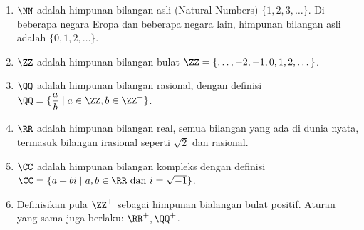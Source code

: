 	\begin{enumerate}
	\item $\NN$ adalah himpunan bilangan asli (Natural Numbers) $\{1,2,3,\dots\}$. Di beberapa negara Eropa dan beberapa negara lain, himpunan bilangan asli adalah $\{0,1,2,\dots\}$.
	\item $\ZZ$ adalah himpunan bilangan bulat $\ZZ=\{\dots,-2,-1,0,1,2,\dots\}$.
	\item $\QQ$ adalah himpunan bilangan rasional, dengan definisi $\QQ=\{\dfrac{a}{b}\mid a\in \ZZ, b\in\ZZ^+\}$.
	\item $\RR$ adalah himpunan bilangan real, semua bilangan yang ada di dunia nyata, termasuk bilangan irasional seperti $\sqrt{2}$ dan rasional.
	\item $\CC$ adalah himpunan bilangan kompleks dengan definisi\\ $\CC = \{a+bi \mid a,b \in \RR \text{ dan }i=\sqrt{-1}\}$.
	\item Definisikan pula $\ZZ^+$ sebagai himpunan bialangan bulat positif. Aturan yang sama juga berlaku: $\RR^+, \QQ^+$.
	\end{enumerate}